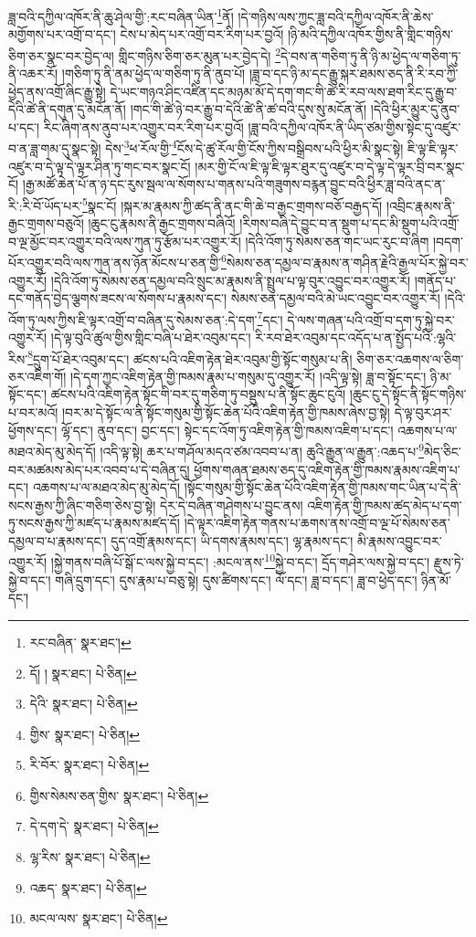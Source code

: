 ཟླ་བའི་དཀྱིལ་འཁོར་ནི་ཆུ་ཤེལ་གྱི་:རང་བཞིན་ཡིན་\footnote{རང་བཞིན་  སྣར་ཐང་། }ནོ། །དེ་གཉིས་ལས་ཀྱང་ཟླ་བའི་དཀྱིལ་འཁོར་ནི་ཆེས་མགྱོགས་པར་འགྲོ་བ་དང་། ངེས་པ་མེད་པར་འགྲོ་བར་རིག་པར་བྱའོ། །ཉི་མའི་དཀྱིལ་འཁོར་གྱིས་ནི་གླིང་གཉིས་ཅིག་ཅར་སྣང་བར་བྱེད་ལ། གླིང་གཉིས་ཅིག་ཅར་མུན་པར་བྱེད་དེ། \footnote{དོ། །   སྣར་ཐང་།  པེ་ཅིན། }དེ་བས་ན་གཅིག་ཏུ་ནི་ཉི་མ་ཕྱེད་ལ་གཅིག་ཏུ་ནི་འཆར་རོ། །གཅིག་ཏུ་ནི་ནམ་ཕྱེད་ལ་གཅིག་ཏུ་ནི་ནུབ་པོ། །ཟླ་བ་དང་ཉི་མ་དང་རྒྱུ་སྐར་ཐམས་ཅད་ནི་རི་རབ་ཀྱི་ཕྱེད་ནས་འགྲོ་ཞིང་རྒྱུ་སྟེ། དེ་ཡང་གཉའ་ཤིང་འཛིན་དང་མཉམ་མོ་དེ་དག་གང་གི་ཚེ་རི་རབ་ལས་ཐག་རིང་དུ་རྒྱུ་བ་དེའི་ཚེ་ནི་དགུན་དུ་མངོན་ནོ། །གང་གི་ཚེ་ཉེ་བར་རྒྱུ་བ་དེའི་ཚེ་ནི་ཚ་བའི་དུས་སུ་མངོན་ནོ། །དེའི་ཕྱིར་མྱུར་དུ་ནུབ་པ་དང་། རིང་ཞིག་ནས་ནུབ་པར་འགྱུར་བར་རིག་པར་བྱའོ། །ཟླ་བའི་དཀྱིལ་འཁོར་ནི་ཡིད་ཙམ་གྱིས་སྟེང་དུ་འཛུར་བ་ན་ཟླ་གམ་དུ་སྣང་སྟེ། དེས་\footnote{དེའི་  སྣར་ཐང་།  པེ་ཅིན། }ཕ་རོལ་གྱི་\footnote{གྱིས་  སྣར་ཐང་།  པེ་ཅིན། }ངོས་དེ་ཚུ་རོལ་གྱི་ངོས་ཀྱིས་བསྒྲིབས་པའི་ཕྱིར་མི་སྣང་སྟེ། ཇི་ལྟ་ཇི་ལྟར་འཛུར་བ་དེ་ལྟ་དེ་ལྟར་ཤིན་ཏུ་གང་བར་སྣང་ངོ། །མར་གྱི་ངོ་ལ་ཇི་ལྟ་ཇི་ལྟར་ཐུར་དུ་འཛུར་བ་དེ་ལྟ་དེ་ལྟར་བྲི་བར་སྣང་ངོ། །རྒྱ་མཚོ་ཆེན་པོ་ན་ཉ་དང་རུས་སྦལ་ལ་སོགས་པ་གནས་པའི་གཟུགས་བརྙན་བྱུང་བའི་ཕྱིར་ཟླ་བའི་ནང་ན་རི་:རི་བོ་ཡོད་པར་\footnote{རི་བོར་  སྣར་ཐང་།  པེ་ཅིན། }སྣང་ངོ། །སྐར་མ་རྣམས་ཀྱི་ཚད་ནི་ནང་གི་ཆེ་བ་རྒྱང་གྲགས་བཅོ་བརྒྱད་དོ། །འབྲིང་རྣམས་ནི་རྒྱང་གྲགས་བཅུའོ། །ཆུང་ངུ་རྣམས་ནི་རྒྱང་གྲགས་བཞིའོ། །རིགས་བཞི་དེ་བྱུང་བ་ན་སྡུག་པ་དང་མི་སྡུག་པའི་འགྲོ་བ་ལྔ་མྱོང་བར་འགྱུར་བའི་ལས་ཀུན་ཏུ་རྩོམ་པར་འགྱུར་རོ། །དེའི་འོག་ཏུ་སེམས་ཅན་གང་ཡང་རུང་བ་ཞིག །བདག་པོར་འགྱུར་བའི་ལས་ཀུན་ནས་ཉོན་མོངས་པ་ཅན་གྱི་\footnote{གྱིས་སེམས་ཅན་གྱིས་  སྣར་ཐང་།  པེ་ཅིན། }སེམས་ཅན་དམྱལ་བ་རྣམས་ན་གཤིན་རྗེའི་རྒྱལ་པོར་སྐྱེ་བར་འགྱུར་རོ། །དེའི་འོག་ཏུ་སེམས་ཅན་དམྱལ་བའི་སྲུང་མ་རྣམས་ནི་སྤྲུལ་པ་ལྟ་བུར་འབྱུང་བར་འགྱུར་རོ། །གནོད་པ་དང་གནོད་བྱེད་ལྕགས་ཟངས་ལ་སོགས་པ་རྣམས་དང་། སེམས་ཅན་དམྱལ་བའི་མེ་ཡང་འབྱུང་བར་འགྱུར་རོ། །དེའི་འོག་ཏུ་ལས་ཀྱིས་ཇི་ལྟར་འགྲོ་བ་བཞིན་དུ་སེམས་ཅན་:དེ་དག་\footnote{དེ་དག་དེ་  སྣར་ཐང་།  པེ་ཅིན། }དང་། དེ་ལས་གཞན་པའི་འགྲོ་བ་དག་ཏུ་སྐྱེ་བར་འགྱུར་རོ། །དེ་ལྟ་བུའི་ཚུལ་གྱིས་གླིང་བཞི་པ་ཐེར་འབུམ་དང་། རི་རབ་ཐེར་འབུམ་དང་འདོད་པ་ན་སྤྱོད་པའི་:ལྷའི་རིས་\footnote{ལྷ་རིས་  སྣར་ཐང་།  པེ་ཅིན། }དྲུག་པོ་ཐེར་འབུམ་དང་། ཚངས་པའི་འཇིག་རྟེན་ཐེར་འབུམ་གྱི་སྟོང་གསུམ་པ་ནི། ཅིག་ཅར་འཆགས་ལ་ཅིག་ཅར་འཇིག་གོ། །དེ་དག་ཀྱང་འཇིག་རྟེན་གྱི་ཁམས་རྣམ་པ་གསུམ་དུ་འགྱུར་རོ། །འདི་ལྟ་སྟེ། ཟླ་བ་སྟོང་དང་། ཉི་མ་སྟོང་དང་། ཚངས་པའི་འཇིག་རྟེན་སྟོང་གི་བར་དུ་གཅིག་ཏུ་བསྡུས་པ་ནི་སྟོང་ཆུང་ངུའོ། །ཆུང་ངུ་དེ་སྟོང་ནི་སྟོང་གཉིས་པ་བར་མའོ། །བར་མ་དེ་སྟོང་ལ་ནི་སྟོང་གསུམ་གྱི་སྟོང་ཆེན་པོའི་འཇིག་རྟེན་གྱི་ཁམས་ཞེས་བྱ་སྟེ། དེ་ལྟ་བུར་ཤར་ཕྱོགས་དང་། ལྷོ་དང་། ནུབ་དང་། བྱང་དང་། སྟེང་དང་འོག་ཏུ་འཇིག་རྟེན་གྱི་ཁམས་འཇིག་པ་དང་། འཆགས་པ་ལ་མཐའ་མེད་མུ་མེད་དོ། །འདི་ལྟ་སྟེ། ཆར་པ་གཤོལ་མདའ་ཙམ་འབབ་པ་ན། ཆུའི་རྒྱུན་ལ་རྒྱུན་:འཆད་པ་\footnote{འཆད་  སྣར་ཐང་།  པེ་ཅིན། }མེད་ཅིང་བར་མཚམས་མེད་པར་འབབ་པ་དེ་བཞིན་དུ། ཕྱོགས་གཞན་ཐམས་ཅད་དུ་འཇིག་རྟེན་གྱི་ཁམས་རྣམས་འཇིག་པ་དང་། འཆགས་པ་ལ་མཐའ་མེད་མུ་མེད་དོ། །སྟོང་གསུམ་གྱི་སྟོང་ཆེན་པོའི་འཇིག་རྟེན་གྱི་ཁམས་གང་ཡིན་པ་དེ་ནི་སངས་རྒྱས་ཀྱི་ཞིང་གཅིག་ཅེས་བྱ་སྟེ། དེར་དེ་བཞིན་གཤེགས་པ་བྱུང་ནས། འཇིག་རྟེན་གྱི་ཁམས་ཚད་མེད་པ་དག་ཏུ་སངས་རྒྱས་ཀྱི་མཛད་པ་རྣམས་མཛད་དོ། །དེ་ལྟར་འཇིག་རྟེན་གནས་པ་ཆགས་ནས་འགྲོ་བ་ལྔ་པོ་སེམས་ཅན་དམྱལ་བ་པ་རྣམས་དང་། དུད་འགྲོ་རྣམས་དང་། ཡི་དགས་རྣམས་དང་། ལྷ་རྣམས་དང་། མི་རྣམས་འབྱུང་བར་འགྱུར་རོ། །སྐྱེ་གནས་བཞི་པོ་སྒོ་ང་ལས་སྐྱེ་བ་དང་། :མངལ་ནས་\footnote{མངལ་ལས་  སྣར་ཐང་།  པེ་ཅིན། }སྐྱེ་བ་དང་། དྲོད་གཤེར་ལས་སྐྱེ་བ་དང་། རྫུས་ཏེ་སྐྱེ་བ་དང་། གཞི་དྲུག་དང་། དུས་རྣམ་པ་བཅུ་སྟེ། དུས་ཚིགས་དང་། ལོ་དང་། ཟླ་བ་དང་། ཟླ་བ་ཕྱེད་དང་། ཉིན་མོ་དང་། 